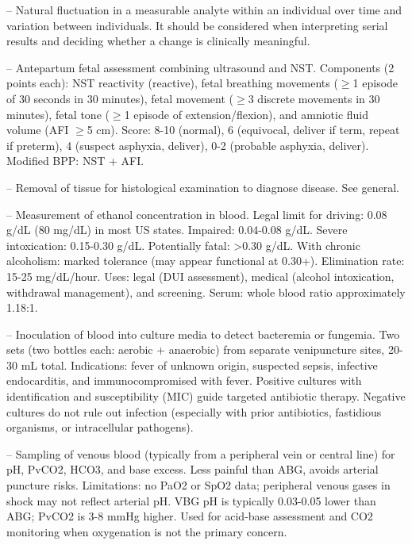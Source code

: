 -- Natural fluctuation in a measurable analyte within an individual over time and variation between individuals. It should be considered when interpreting serial results and deciding whether a change is clinically meaningful.

-- Antepartum fetal assessment combining ultrasound and NST. Components (2 points each): NST reactivity (reactive), fetal breathing movements (\(\ge\)1 episode of 30 seconds in 30 minutes), fetal movement (\(\ge\)3 discrete movements in 30 minutes), fetal tone (\(\ge\)1 episode of extension/flexion), and amniotic fluid volume (AFI \(\ge\)5 cm). Score: 8-10 (normal), 6 (equivocal, deliver if term, repeat if preterm), 4 (suspect asphyxia, deliver), 0-2 (probable asphyxia, deliver). Modified BPP: NST + AFI.

-- Removal of tissue for histological examination to diagnose disease. See general.

-- Measurement of ethanol concentration in blood. Legal limit for driving: 0.08 g/dL (80 mg/dL) in most US states. Impaired: 0.04-0.08 g/dL. Severe intoxication: 0.15-0.30 g/dL. Potentially fatal: >0.30 g/dL. With chronic alcoholism: marked tolerance (may appear functional at 0.30+). Elimination rate: 15-25 mg/dL/hour. Uses: legal (DUI assessment), medical (alcohol intoxication, withdrawal management), and screening. Serum: whole blood ratio approximately 1.18:1.

-- Inoculation of blood into culture media to detect bacteremia or fungemia. Two sets (two bottles each: aerobic + anaerobic) from separate venipuncture sites, 20-30 mL total. Indications: fever of unknown origin, suspected sepsis, infective endocarditis, and immunocompromised with fever. Positive cultures with identification and susceptibility (MIC) guide targeted antibiotic therapy. Negative cultures do not rule out infection (especially with prior antibiotics, fastidious organisms, or intracellular pathogens).

-- Sampling of venous blood (typically from a peripheral vein or central line) for pH, PvCO2, HCO3, and base excess. Less painful than ABG, avoids arterial puncture risks. Limitations: no PaO2 or SpO2 data; peripheral venous gases in shock may not reflect arterial pH. VBG pH is typically 0.03-0.05 lower than ABG; PvCO2 is 3-8 mmHg higher. Used for acid-base assessment and CO2 monitoring when oxygenation is not the primary concern.

